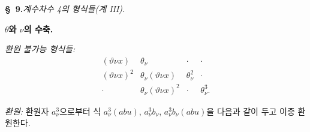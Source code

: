 
\begin{center}
\textbf{\S\ 9.}\quad\emph{계수차수 4의 형식들(계 III).}
\end{center}

\noindent\textbf{$\theta$와 $\nu$의 수축.}

\noindent\emph{환원 불가능 형식들:}
\[
\begin{array}{cccc}
(\vartheta\nu x)&\theta_\nu&\cdot&\cdot\\
(\vartheta\nu x)^2&\theta_\nu(\vartheta\nu x)&\theta_\nu^2&\cdot\\
\cdot&\theta_\nu(\vartheta\nu x)^2&\cdot&\theta_\nu^3.
\end{array}
\]

\noindent\emph{환원:} 환원자 $a_\nu^3$으로부터 식 $a_\nu^3(abu)$, $a_\nu^3b_\nu$, $a_\nu^3b_\nu(abu)$을 다음과 같이 두고 이중 환원한다.
